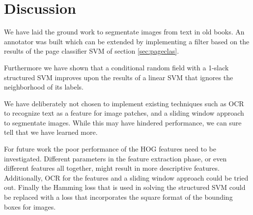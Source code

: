 \section{Discussion}%
\label{sec:discussionconclusion}

We have laid the ground work to segmentate images from text in old books. An
annotator was built which can be extended by implementing a filter
based on the results of the page classifier SVM of section \ref{sec:pageclas}.

Furthermore we have shown that a conditional random field with a 1-slack
structured SVM improves upon the results of a linear SVM that ignores the
neighborhood of its labels.

We have deliberately not chosen to implement existing techniques such as OCR to
recognize text as a feature for image patches, and a sliding window approach to
segmentate images. While this may have hindered performance, we can sure tell
that we have learned more.

For future work the poor performance of the HOG features need to be
investigated. Different parameters in the feature extraction phase, or even
different features all together, might result in more descriptive features.
Additionally, OCR for the features and a sliding window approach could be tried
out. Finally the Hamming loss that is used in solving the structured SVM
could be replaced with a loss that incorporates the square format of the
bounding boxes for images.

